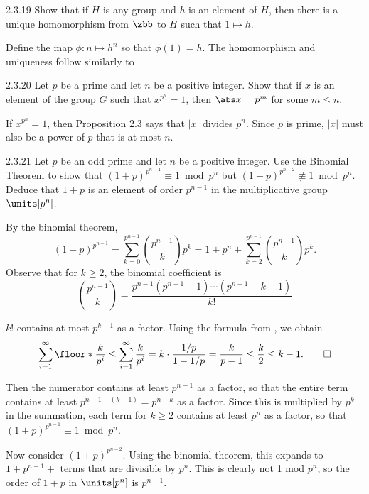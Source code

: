 \begin{exercise}{2.3.19}
    Show that if $H$ is any group and $h$ is an element of $H$, then there is a unique homomorphism from $\zbb$ to $H$ such that $1 \mapsto h$.
\end{exercise}

\begin{sol}
    Define the map $\phi : n \mapsto h^n$ so that $\phi(1) = h$.
	The homomorphism and uniqueness follow similarly to .
\end{sol}

\begin{exercise}{2.3.20}
    Let $p$ be a prime and let $n$ be a positive integer.
	Show that if $x$ is an element of the group $G$ such that $x^{p^n} = 1$, then $\abs x = p^m$ for some $m \leq n$.
\end{exercise}

\begin{sol}
    If $x^{p^n} = 1$, then Proposition 2.3 says that $|x|$ divides $p^n$.
	Since $p$ is prime, $|x|$ must also be a power of $p$ that is at most $n$.
\end{sol}

\begin{spex}{2.3.21}
    Let $p$ be an odd prime and let $n$ be a positive integer.
	Use the Binomial Theorem to show that $(1 + p)^{p^{n - 1}} \equiv 1 \bmod p^n$ but $(1 + p)^{p^{n - 2}} \not\equiv 1 \bmod p^n$.
	Deduce that $1 + p$ is an element of order $p^{n - 1}$ in the multiplicative group $\units[p^n]$.
\end{spex}

\begin{sol}[spsol]
    By the binomial theorem,
    \[
    	(1 + p)^{p^{n - 1}} = \sum_{k = 0}^{p^{n - 1}} \binom{p^{n - 1}}k p^k = 1 + p^n + \sum_{k = 2}^{p^{n - 1}} \binom{p^{n - 1}}k p^k.
    \]
    Observe that for $k \geq 2$, the binomial coefficient is
    \[
    	\binom{p^{n - 1}}{k} = \frac{p^{n - 1}(p^{n - 1} - 1) \cdots (p^{n - 1} - k + 1)}{k!}
    \]
    \begin{lemma}{$k!$ contains at most $p^{k - 1}$ as a factor.}
        Using the formula from , we obtain
        \[
        	\sum_{i = 1}^{\infty} \floor*{\frac{k}{p^i}} \leq \sum_{i = 1}^\infty \frac{k}{p^i} = k \cdot \frac{1/p}{1 - 1/p} = \frac{k}{p - 1} \leq \frac k2 \leq k - 1. \qedhere
        \]
    \end{lemma}
    Then the numerator contains at least $p^{n - 1}$ as a factor, so that the entire term contains at least $p^{n - 1 - (k - 1)} = p^{n - k}$ as a factor.
	Since this is multiplied by $p^k$ in the summation, each term for $k \geq 2$ contains at least $p^n$ as a factor, so that $(1 + p)^{p^{n - 1}} \equiv 1 \bmod p^n$.

    Now consider $(1 + p)^{p^{n - 2}}$.
	Using the binomial theorem, this expands to $1 + p^{n - 1} +$ terms that are divisible by $p^n$.
	This is clearly not 1 mod $p^n$, so the order of $1 + p$ in $\units[p^n]$ is $p^{n - 1}$.
\end{sol}

